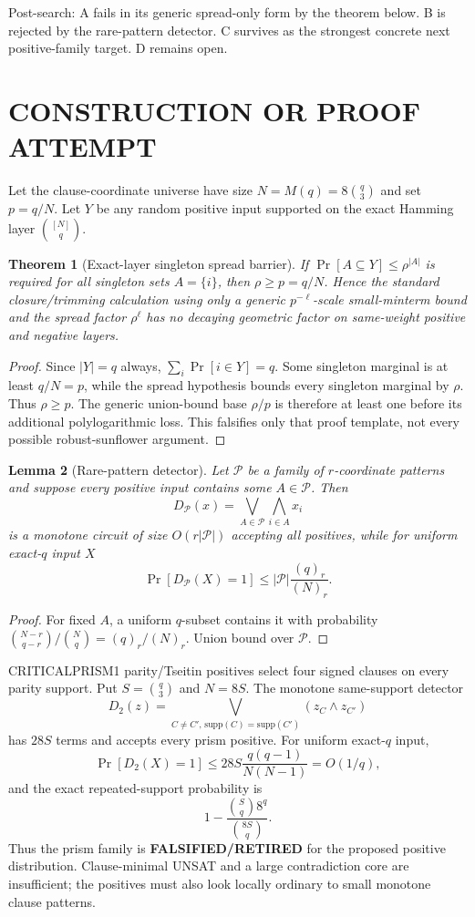 \documentclass[11pt]{article}
\newtheorem{theorem}{Theorem}
\newtheorem{lemma}[theorem]{Lemma}
\begin{document}
Post-search: A fails in its generic spread-only form by the theorem below. B is rejected by the rare-pattern detector. C survives as the strongest concrete next positive-family target. D remains open.

\section{CONSTRUCTION OR PROOF ATTEMPT}
Let the clause-coordinate universe have size $N=M(q)=8\binom q3$ and set $p=q/N$. Let $Y$ be any random positive input supported on the exact Hamming layer $\binom{[N]}q$.

\begin{theorem}[Exact-layer singleton spread barrier]
If $\Pr[A\subseteq Y]\le\rho^{|A|}$ is required for all singleton sets $A=\{i\}$, then $\rho\ge p=q/N$. Hence the standard closure/trimming calculation using only a generic $p^{-\ell}$-scale small-minterm bound and the spread factor $\rho^\ell$ has no decaying geometric factor on same-weight positive and negative layers.
\end{theorem}
\begin{proof}
Since $|Y|=q$ always, $\sum_i\Pr[i\in Y]=q$. Some singleton marginal is at least $q/N=p$, while the spread hypothesis bounds every singleton marginal by $\rho$. Thus $\rho\ge p$. The generic union-bound base $\rho/p$ is therefore at least one before its additional polylogarithmic loss. This falsifies only that proof template, not every possible robust-sunflower argument.
\end{proof}

\begin{lemma}[Rare-pattern detector]
Let $\mathcal P$ be a family of $r$-coordinate patterns and suppose every positive input contains some $A\in\mathcal P$. Then
\[D_{\mathcal P}(x)=\bigvee_{A\in\mathcal P}\bigwedge_{i\in A}x_i\]
is a monotone circuit of size $O(r|\mathcal P|)$ accepting all positives, while for uniform exact-$q$ input $X$
\[\Pr[D_{\mathcal P}(X)=1]\le |\mathcal P|\frac{(q)_r}{(N)_r}.\]
\end{lemma}
\begin{proof}
For fixed $A$, a uniform $q$-subset contains it with probability $\binom{N-r}{q-r}/\binom Nq=(q)_r/(N)_r$. Union bound over $\mathcal P$.
\end{proof}

CRITICALPRISM1 parity/Tseitin positives select four signed clauses on every parity support. Put $S=\binom q3$ and $N=8S$. The monotone same-support detector
\[D_2(z)=\bigvee_{C\ne C',\,\mathrm{supp}(C)=\mathrm{supp}(C')}(z_C\wedge z_{C'})\]
has $28S$ terms and accepts every prism positive. For uniform exact-$q$ input,
\[\Pr[D_2(X)=1]\le 28S\frac{q(q-1)}{N(N-1)}=O(1/q),\]
and the exact repeated-support probability is
\[1-\frac{\binom Sq8^q}{\binom{8S}q}.\]
Thus the prism family is \textbf{FALSIFIED/RETIRED} for the proposed positive distribution. Clause-minimal UNSAT and a large contradiction core are insufficient; the positives must also look locally ordinary to small monotone clause patterns.
\end{document}
